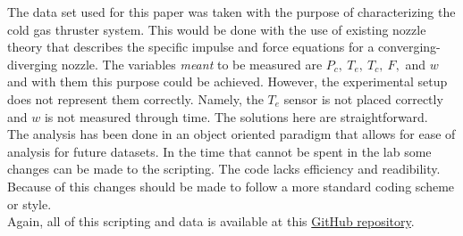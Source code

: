 The data set used for this paper was taken with the purpose of characterizing the cold gas thruster system. This would be done with the use of existing nozzle theory that describes the specific impulse and force equations for a converging-diverging nozzle. The variables \textit{meant} to be measured are $P_c,\ T_e,\ T_c,\ F,$ and $w$ and with them this purpose could be achieved. However, the experimental setup does not represent them correctly. Namely, the $T_e$ sensor is not placed correctly and $w$ is not measured through time. The solutions here are straightforward.\\
The analysis has been done in an object oriented paradigm that allows for ease of analysis for future datasets. In the time that cannot be spent in the lab some changes can be made to the scripting. The code lacks efficiency and readibility. Because of this changes should be made to follow a more standard coding scheme or style.\\
Again, all of this scripting and data is available at this \href{https://github.com/maxmhuggins/RCS_HAB}{GitHub repository}.